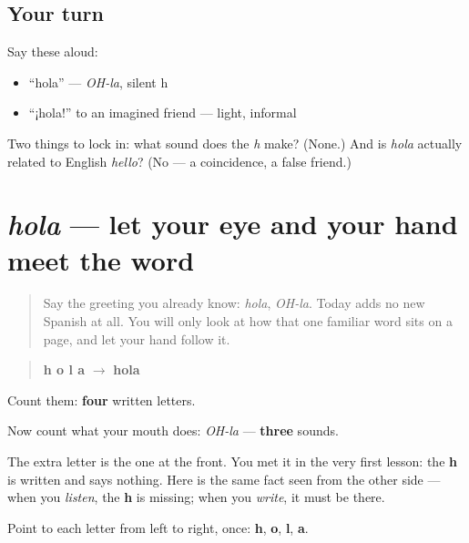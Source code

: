 \subsection*{Your turn}
Say these aloud:

\begin{itemize}
\raggedright
  \item \textquotedblleft{}hola\textquotedblright{} — \emph{OH-la}, silent h
  \item \textquotedblleft{}¡hola!\textquotedblright{} to an imagined friend — light, informal
\end{itemize}

\begin{tcolorbox}[breakable,colback=teal!4,colframe=teal!35!black,title={Before you move on}]
Two things to lock in: what sound does the \emph{h} make? (None.) And is \emph{hola} actually related to English \emph{hello}? (No — a coincidence, a false friend.)
\end{tcolorbox}
\section[hola]{\emph{hola} — let your eye and your hand meet the word}

\label{lesson:ES-W00-hola-observe}



\begin{quote}
Say the greeting you already know: \emph{hola}, \emph{OH-la}. Today adds no new Spanish at all. You will only look at how that one familiar word sits on a page, and let your hand follow it.
\end{quote}

\begin{grammarlens}[title={What you've built — one written word}]
\begin{quote}
\textbf{h o l a} $\to$ \textbf{hola}
\end{quote}

Count them: \textbf{four} written letters.

Now count what your mouth does: \emph{OH-la} — \textbf{three} sounds.

The extra letter is the one at the front. You met it in the very first lesson: the \textbf{h} is written and says nothing. Here is the same fact seen from the other side — when you \emph{listen}, the \textbf{h} is missing; when you \emph{write}, it must be there.

Point to each letter from left to right, once: \textbf{h}, \textbf{o}, \textbf{l}, \textbf{a}.
\end{grammarlens}

